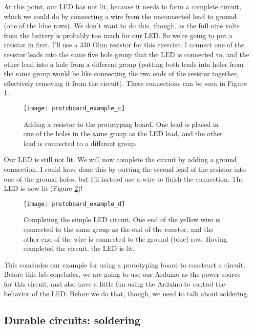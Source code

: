 At this point, our LED has not lit, because it needs to form a complete circuit,
which we could do by connecting a wire from the unconnected lead to ground
(one of the blue rows). We don't want to do this, though, as the full nine
volts from the battery is probably too much for our LED. So we're going to put
a resistor in first. I'll use a 330 Ohm resistor for this exercise. I connect
one of the resistor leads into the same five hole group that the LED is 
connected to, and the other lead into a hole from a different group (putting
both leads into holes from the same group would be like connecting the two
ends of the resistor together, effectively removing it from the circuit). These
connections can be seen in Figure \ref{fig:protoboard_example_c}.
\begin{figure}[hbp!]
\centering
\texttt{[image: protoboard\_example\_c]}
\caption[Adding a resistor to the prototyping board]{Adding a resistor to the
prototyping board. One lead is placed in one of the holes in the same group
as the LED lead, and the other lead is connected to a different group.}
\label{fig:protoboard_example_c}
\end{figure}

Our LED is still not lit. We will now complete the circuit by adding a ground
connection. I could have done this by putting the second lead of the resistor
into one of the ground holes, but I'll instead use a wire to finish the
connection. The LED is now lit (Figure \ref{fig:protoboard_example_d})!
\begin{figure}[hbp!]
\centering
\texttt{[image: protoboard\_example\_d]}
\caption[Completing the simple LED circuit]{Completing the simple LED circuit.
One end of the yellow wire is connected to the same group as the end of the
resistor, and the other end of the wire is connected to the ground (blue)
row. Having completed the circuit, the LED is lit.}
\label{fig:protoboard_example_d}
\end{figure}


This concludes our example for using a prototyping board to construct a circuit.
Before this lab concludes, we are going to use our Arduino as the power source
for this circuit, and also have a little fun using the Arduino to control the
behavior of the LED. Before we do that, though, we need to talk about soldering.

\subsection{Durable circuits: soldering}

